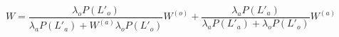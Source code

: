 \begin{equation}\label{overall_waiting_time}
    W = \frac{\lambda_o P(L'_o)}{\lambda_a P(L'_a) + W^{(a)}\lambda_o P(L'_o)} W^{(o)} + \frac{\lambda_a P(L'_a)}{\lambda_a P(L'_a) + \lambda_o P(L'_o)} W^{(a)}
\end{equation}





